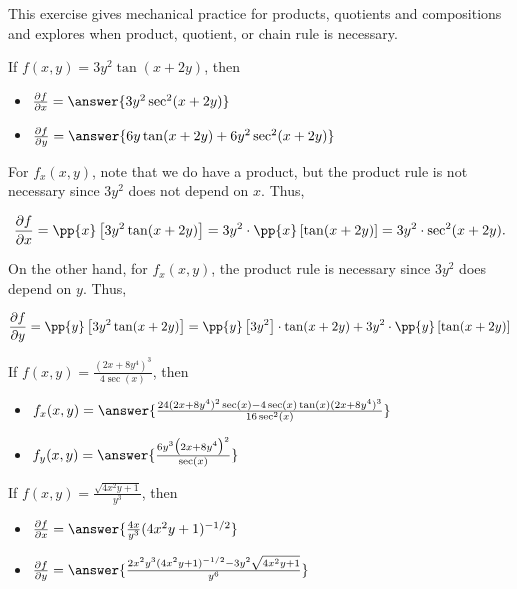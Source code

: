 \documentclass{ximera}
\author{Jim Talamo}
\newcommand{\Pp}[2]{\frac{\partial #1}{\partial #2}}
\begin{document}
This exercise gives mechanical practice for products, quotients and compositions and explores when product, quotient, or chain rule is necessary.


\begin{exercise}
If $f(x,y) = 3y^2 \tan(x+2y)$, then 

\begin{itemize}
\item $\Pp{f}{x} = \answer{3y^2\sec^2(x+2y)}$
\item $\Pp{f}{y} = \answer{6y \tan(x+2y) + 6y^2 \sec^2(x+2y)}$
\end{itemize}

\begin{hint}
For $f_x(x,y)$, note that we do have a product, but the product rule is not necessary since $3y^2$ does not depend on $x$.  Thus,

\[
\Pp{f}{x} = \pp{x} \left[ 3y^2 \tan(x+2y) \right] = 3y^2 \cdot \pp{x} \left[ \tan(x+2y) \right] = 3y^2  \cdot \sec^2(x+2y) .
\]

On the other hand, for $f_x(x,y)$, the product rule is necessary since $3y^2$ does depend on $y$.  Thus,

\[
\Pp{f}{y} = \pp{y} \left[ 3y^2 \tan(x+2y) \right] =   \pp{y}  \left[ 3y^2 \right]  \cdot \tan(x+2y)+ 3y^2 \cdot \pp{y} \left[ \tan(x+2y) \right] 
\]
\end{hint}
\end{exercise}


\begin{exercise}
If $f(x,y) = \frac{(2x+8y^4)^3}{4\sec(x)}$, then 

\begin{itemize}
\item $f_x(x,y) = \answer{\frac{24(2x+8y^4)^2 \sec(x) - 4\sec(x)\tan(x) (2x+8y^4)^3}{16 \sec^2(x)}  }$
\item $f_y(x,y) = \answer{\frac{6y^3 \big(2x+8y^4\big)^2}{\sec(x)}}$
\end{itemize}


\end{exercise}


\begin{exercise}
If $f(x,y) = \frac{\sqrt{4x^2y+1}}{y^3}$, then 

\begin{itemize}
\item $\Pp{f}{x} = \answer{\frac{4x}{y^3} (4x^2y+1)^{-1/2} }$
\item $\Pp{f}{y} = \answer{\frac{2x^2y^3 (4x^2y+1)^{-1/2} - 3y^2\sqrt{4x^2y+1}}{y^6} }$
\end{itemize}


\end{exercise}
\end{document}

